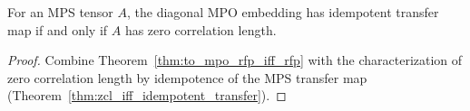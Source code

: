 \begin{theorem}%
    \label{thm:to_mpo_rfp_iff_zcl}
    \leanok
    For an MPS tensor $A$, the diagonal MPO embedding has idempotent transfer
    map if and only if $A$ has zero correlation length.
\end{theorem}

\begin{proof}
    \leanok
    Combine Theorem~\ref{thm:to_mpo_rfp_iff_rfp} with the characterization of
    zero correlation length by idempotence of the MPS transfer map
    (Theorem~\ref{thm:zcl_iff_idempotent_transfer}).
\end{proof}

